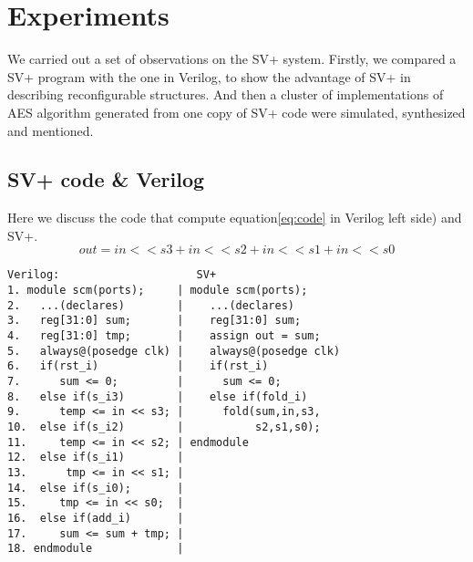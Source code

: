 \section{Experiments}\label{sec:experiments}
We carried out a set of observations on the SV+ system. Firstly, we compared a SV+ program with the one in Verilog, to show the advantage of SV+ in describing reconfigurable structures. And then a cluster of implementations of AES algorithm generated from one copy of SV+ code were simulated, synthesized and mentioned.
\subsection{SV+ code \& Verilog}
Here we discuss the code that compute equation\eqref{eq:code} in Verilog left side) and SV+.
\begin{equation}
out = in{<<}s3{+}in{<<}s2{+}in{<<}s1{+}in{<<}s0  
\label{eq:code}
\end{equation}
\begin{verbatim}
Verilog:                     SV+
1. module scm(ports);     | module scm(ports);
2.   ...(declares)        |    ...(declares)
3.   reg[31:0] sum;       |    reg[31:0] sum;
4.   reg[31:0] tmp;       |    assign out = sum;
5.   always@(posedge clk) |    always@(posedge clk)
6.   if(rst_i)            |    if(rst_i)
7.      sum <= 0;         |      sum <= 0;
8.   else if(s_i3)        |    else if(fold_i)
9.      temp <= in << s3; |      fold(sum,in,s3,
10.  else if(s_i2)        |           s2,s1,s0);
11.     temp <= in << s2; | endmodule
12.  else if(s_i1)        |      
13.      tmp <= in << s1; |       
14.  else if(s_i0);       |  
15.     tmp <= in << s0;  |
16.  else if(add_i)       |
17.     sum <= sum + tmp; |
18. endmodule             | 
\end{verbatim}
